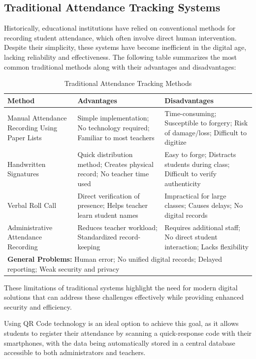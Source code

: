 \documentclass[12pt,a4paper]{report}
\begin{document}
\subsection{Traditional Attendance Tracking Systems}
Historically, educational institutions have relied on conventional methods for recording student attendance, which often involve direct human intervention. Despite their simplicity, these systems have become inefficient in the digital age, lacking reliability and effectiveness. The following table summarizes the most common traditional methods along with their advantages and disadvantages:

\begin{table}[htbp]
\centering
\caption{Traditional Attendance Tracking Methods}
\label{tab:traditional-attendance}
\begin{tabular}{|p{3cm}|p{5cm}|p{5cm}|}
\hline
\textbf{Method} & \textbf{Advantages} & \textbf{Disadvantages} \\
\hline
Manual Attendance Recording Using Paper Lists & 
Simple implementation; No technology required; Familiar to most teachers & 
Time-consuming; Susceptible to forgery; Risk of damage/loss; Difficult to digitize \\
\hline
Handwritten Signatures & 
Quick distribution method; Creates physical record; No teacher time used & 
Easy to forge; Distracts students during class; Difficult to verify authenticity \\
\hline
Verbal Roll Call & 
Direct verification of presence; Helps teacher learn student names & 
Impractical for large classes; Causes delays; No digital records \\
\hline
Administrative Attendance Recording & 
Reduces teacher workload; Standardized record-keeping & 
Requires additional staff; No direct student interaction; Lacks flexibility \\
\hline
\multicolumn{3}{|p{13cm}|}{\textbf{General Problems:} Human error; No unified digital records; Delayed reporting; Weak security and privacy} \\
\hline
\end{tabular}
\end{table}

\vspace{7cm}

These limitations of traditional systems highlight the need for modern digital solutions that can address these challenges effectively while providing enhanced security and efficiency.

Using QR Code technology is an ideal option to achieve this goal, as it allows students to register their attendance by scanning a quick-response code with their smartphones, with the data being automatically stored in a central database accessible to both administrators and teachers.
\end{document}
